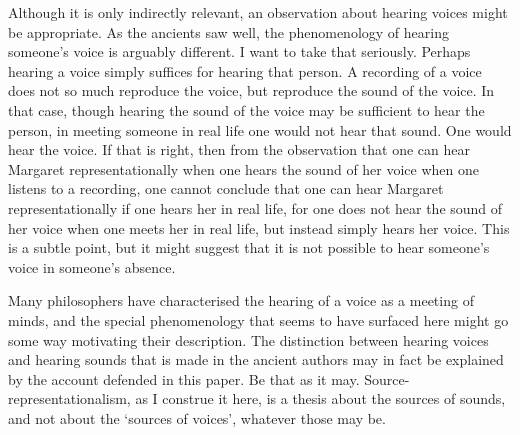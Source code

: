 \documentclass[sloppy, journal, git, bytitle, dodraft]{humapap}
\begin{document}
% 
% 

\sect Although it is only indirectly relevant, an observation about hearing voices might be appropriate. As the ancients saw well, the phenomenology of hearing someone's voice is arguably different. I want to take that seriously. Perhaps hearing a voice simply suffices for hearing that person. A recording of a voice does not so much reproduce the voice, but reproduce the sound of the voice. In that case, though hearing the sound of the voice may be sufficient to hear the person, in meeting someone in real life one would not hear that sound. One would hear the voice. If that is right, then from the observation that one can hear Margaret representationally when one hears the sound of her voice when one listens to a recording, one cannot conclude that one can hear Margaret representationally if one hears her in real life, for one does not hear the sound of her voice when one meets her in real life, but instead simply hears her voice. This is a subtle point, but it might suggest that it is not possible to hear someone's voice in someone's absence. 

Many philosophers have characterised the hearing of a voice as a meeting of minds, and the special phenomenology that seems to have surfaced here might go some way motivating their description. The distinction between hearing voices and hearing sounds that is made in the ancient authors may in fact be explained by the account defended in this paper. Be that as it may. Source-representationalism, as I construe it here, is a thesis about the sources of sounds, and not about the `sources of voices', whatever those may be.

\end{document}
